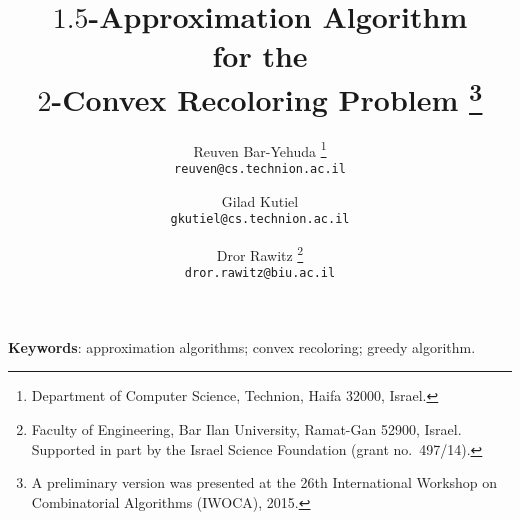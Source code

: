\title{\bf $1.5$-Approximation Algorithm	\\
for the 									\\ 
$2$-Convex Recoloring Problem%
\thanks{A preliminary version was presented at the 26th
International Workshop on Combinatorial Algorithms (IWOCA), 2015.}
}

\begin{titlepage}

\author{%
Reuven Bar-Yehuda%
\thanks{Department of Computer Science, Technion, Haifa 32000, Israel.}
\\
{\tt\small reuven@cs.technion.ac.il}
\and
Gilad Kutiel\footnotemark[2] \\
{\tt\small gkutiel@cs.technion.ac.il}
\and
Dror Rawitz%
\thanks{Faculty of Engineering, Bar Ilan University, Ramat-Gan 52900,
Israel.  Supported in part by the Israel Science Foundation (grant
no.~497/14).} \\
{\tt\small dror.rawitz@biu.ac.il}
%
}

\maketitle



\medskip

\noindent
\textbf{Keywords}:
approximation algorithms; convex recoloring; greedy algorithm.

\renewcommand{\thepage}{}
\end{titlepage}

